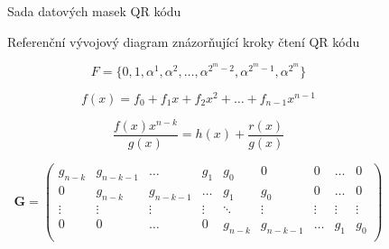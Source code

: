 \begin{figure}[H]
  \begin{center}
    \caption{Sada datových masek QR kódu}
    \label{QRCodeDataMasks}
  \end{center}
\end{figure}

\begin{figure}[H]
  \begin{center}
    \caption{Referenční vývojový diagram znázorňující kroky čtení QR kódu}
    \label{QRCodeReferenceReadingProcess}
  \end{center}
\end{figure}

\begin{equation}
  F = \{ 0, 1, \alpha^1, \alpha^2, \ldots, \alpha^{2^{m}-2}, \alpha^{2^{m}-1},
  \alpha^{2^{m}}\}
\end{equation}

\begin{equation}
  f(x) = f_{0} + f_{1}x + f_{2}x^2 + \ldots + f_{n-1}x^{n-1}
\end{equation}

\begin{equation}
  \frac{f(x) x^{n-k}}{g(x)} = h(x) + \frac{r(x)}{g(x)}
\end{equation}

\begin{equation}
  \mathbf{G} = \left(
    \begin{array}{ccccccccc}
      g_{n-k} & g_{n-k-1} & \ldots & g_{1} & g_{0} & 0 & 0 & \ldots & 0 \\
      0 & g_{n-k} & g_{n-k-1} & \ldots & g_{1} & g_{0} & 0 & \ldots & 0 \\
      \vdots & \vdots & \vdots & \vdots & \ddots & \vdots & \vdots & \vdots &
      \vdots\\
      0 & 0 & \ldots & 0 & g_{n-k} & g_{n-k-1} & \ldots & g_{1} & g_{0} \\
    \end{array}
  \right)
\end{equation}

